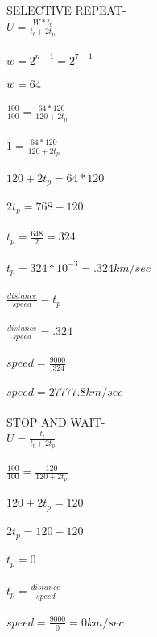 \documentclass[a4paper,12pt]{article}
\begin{document}
SELECTIVE REPEAT-\\
$U=\frac{W*t_{t}}{t_{t}+2t_{p}}$\\\\
$w=2^{n-1}=2^{7-1}$\\\\
$w=64$\\\\
$\frac{100}{100}=\frac{64*120}{120+2t_{p}}$\\\\
$1=\frac{64*120}{120+2t_{p}}$\\\\
$120+2t_{p}=64*120$\\\\
$2t_{p}=768-120$\\\\
$t_{p}=\frac{648}{2}=324$\\\\
$t_{p}=324*10^{-3}=.324 km/sec$\\\\
$\frac{distance}{speed}=t_{p}$\\\\
$\frac{distance}{speed}=.324$\\\\
$speed=\frac{9000}{.324}$\\\\
$speed=27777.8 km/sec$\\\\

STOP AND WAIT-\\
$U=\frac{t_{t}}{t_{t}+2t_{p}}$\\\\
$\frac{100}{100}=\frac{120}{120+2t_{p}}$\\\\
$120+2t_{p}=120$\\\\
$2t_{p}=120-120$\\\\
$t_{p}=0$\\\\
$t_{p}=\frac{distance}{speed}$\\\\
$speed=\frac{9000}{0}=0 km/sec$\\\\
\end{document}
